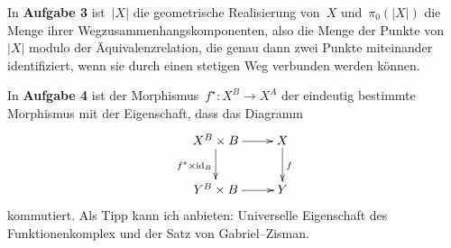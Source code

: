 \documentclass{uebblatt}
\begin{document}
In \textbf{Aufgabe 3} ist~$|X|$ die geometrische Realisierung von~$X$
und~$\pi_0(|X|)$ die Menge ihrer Wegzusammenhangskomponenten, also die Menge
der Punkte von~$|X|$ modulo der Äquivalenzrelation, die genau dann zwei Punkte
miteinander identifiziert, wenn sie durch einen stetigen Weg verbunden werden
können.

In \textbf{Aufgabe 4} ist der Morphismus~$f^\star : X^B \to X^A$ der eindeutig
bestimmte Morphismus mit der Eigenschaft, dass das Diagramm
\[ \xymatrix{
  X^B \times B \ar[r] \ar[d]_{f^\star \times \id_B} & X \ar[d]^f \\
  Y^B \times B \ar[r] & Y
} \]
kommutiert. Als Tipp kann ich anbieten: Universelle Eigenschaft des
Funktionenkomplex und der Satz von Gabriel--Zisman.
\end{document}
